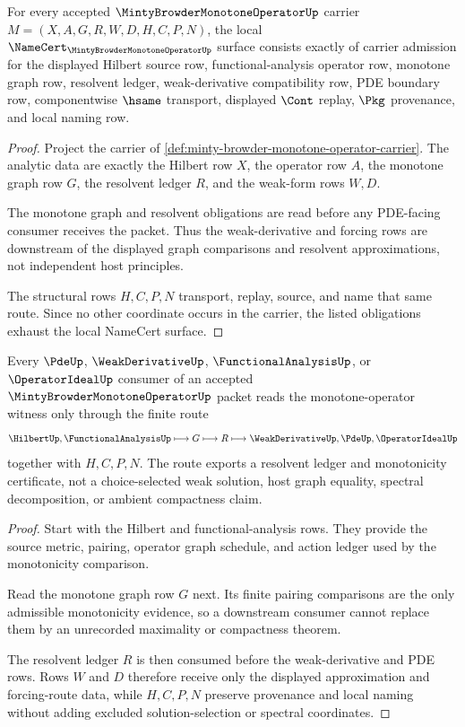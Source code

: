\begin{theorem}
\label{thm:minty-browder-monotone-operator-namecert-obligations}
For every accepted $\MintyBrowderMonotoneOperatorUp$ carrier $M=(X,A,G,R,W,D,H,C,P,N)$, the local $\NameCert_{\MintyBrowderMonotoneOperatorUp}$ surface consists exactly of carrier admission for the displayed Hilbert source row, functional-analysis operator row, monotone graph row, resolvent ledger, weak-derivative compatibility row, PDE boundary row, componentwise $\hsame$ transport, displayed $\Cont$ replay, $\Pkg$ provenance, and local naming row.
\end{theorem}
\begin{proof}
Project the carrier of \autoref{def:minty-browder-monotone-operator-carrier}. The analytic data are exactly the Hilbert row $X$, the operator row $A$, the monotone graph row $G$, the resolvent ledger $R$, and the weak-form rows $W,D$.

The monotone graph and resolvent obligations are read before any PDE-facing consumer receives the packet. Thus the weak-derivative and forcing rows are downstream of the displayed graph comparisons and resolvent approximations, not independent host principles.

The structural rows $H,C,P,N$ transport, replay, source, and name that same route. Since no other coordinate occurs in the carrier, the listed obligations exhaust the local NameCert surface.
\end{proof}

\begin{theorem}
\label{thm:minty-browder-monotone-operator-resolvent-ledger}
Every $\PdeUp$, $\WeakDerivativeUp$, $\FunctionalAnalysisUp$, or $\OperatorIdealUp$ consumer of an accepted $\MintyBrowderMonotoneOperatorUp$ packet reads the monotone-operator witness only through the finite route
$$
\HilbertUp,\FunctionalAnalysisUp \longmapsto G \longmapsto R \longmapsto \WeakDerivativeUp,\PdeUp,\OperatorIdealUp
$$
together with $H,C,P,N$. The route exports a resolvent ledger and monotonicity certificate, not a choice-selected weak solution, host graph equality, spectral decomposition, or ambient compactness claim.
\end{theorem}
\begin{proof}
Start with the Hilbert and functional-analysis rows. They provide the source metric, pairing, operator graph schedule, and action ledger used by the monotonicity comparison.

Read the monotone graph row $G$ next. Its finite pairing comparisons are the only admissible monotonicity evidence, so a downstream consumer cannot replace them by an unrecorded maximality or compactness theorem.

The resolvent ledger $R$ is then consumed before the weak-derivative and PDE rows. Rows $W$ and $D$ therefore receive only the displayed approximation and forcing-route data, while $H,C,P,N$ preserve provenance and local naming without adding excluded solution-selection or spectral coordinates.
\end{proof}

